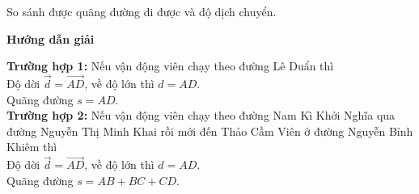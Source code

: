 \begin{dang}{So sánh được quãng đường đi được và độ dịch chuyển.}
{\begin{center}
\end{center}
}
{\begin{center}
		\textbf{Hướng dẫn giải}
	\end{center}
\textbf{Trường hợp 1:} Nếu vận động viên chạy theo đường Lê Duẩn thì\\
	Độ dời $\vec{d}=\overrightarrow{AD}$, về độ lớn thì $d=AD$.\\
	Quãng đường $s=AD$.\\
\textbf{Trường hợp 2:} Nếu vận động viên chạy theo đường Nam Kì Khởi Nghĩa qua đường Nguyễn Thị Minh Khai rồi mới đến Thảo Cầm Viên ở đường Nguyễn Bỉnh Khiêm thì\\
Độ dời $\vec{d}=\overrightarrow{AD}$, về độ lớn thì $d=AD$.\\
Quãng đường $s=AB+BC+CD$.
}
\end{dang}

